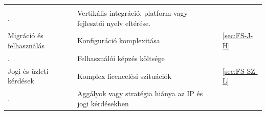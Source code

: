 \documentclass[12pt,magyar,a4paper,oneside]{scrreprt}
\begin{document}
\begin{longtable}[]{@{}lll@{}}
\begin{minipage}[t]{0.18\columnwidth}
\strut
\end{minipage}\tabularnewline
\begin{minipage}[t]{0.24\columnwidth}\raggedright
.\strut
\end{minipage} & \begin{minipage}[t]{0.49\columnwidth}\raggedright
Vertikális integráció, platform vagy fejlesztői nyelv eltérése.\strut
\end{minipage} & \begin{minipage}[t]{0.18\columnwidth}\raggedright
\strut
\end{minipage}\tabularnewline
\begin{minipage}[t]{0.24\columnwidth}\raggedright
Migráció és felhasználás\strut
\end{minipage} & \begin{minipage}[t]{0.49\columnwidth}\raggedright
Konfiguráció komplexitása\strut
\end{minipage} & \begin{minipage}[t]{0.18\columnwidth}\raggedright
\ref{sec:FS-J-H}\strut
\end{minipage}\tabularnewline
\begin{minipage}[t]{0.24\columnwidth}\raggedright
.\strut
\end{minipage} & \begin{minipage}[t]{0.49\columnwidth}\raggedright
Felhasználói képzés költsége\strut
\end{minipage} & \begin{minipage}[t]{0.18\columnwidth}\raggedright
\strut
\end{minipage}\tabularnewline
\begin{minipage}[t]{0.24\columnwidth}\raggedright
Jogi és üzleti kérdések\strut
\end{minipage} & \begin{minipage}[t]{0.49\columnwidth}\raggedright
Komplex licencelési szituációk\strut
\end{minipage} & \begin{minipage}[t]{0.18\columnwidth}\raggedright
\ref{sec:FS-SZ-L}\strut
\end{minipage}\tabularnewline
\begin{minipage}[t]{0.24\columnwidth}\raggedright
.\strut
\end{minipage} & \begin{minipage}[t]{0.49\columnwidth}\raggedright
Aggályok vagy stratégia hiánya az IP és jogi kérdésekben\strut
\end{minipage} & \begin{minipage}[t]{0.18\columnwidth}\raggedright

\end{minipage}
\end{longtable}
\end{document}
